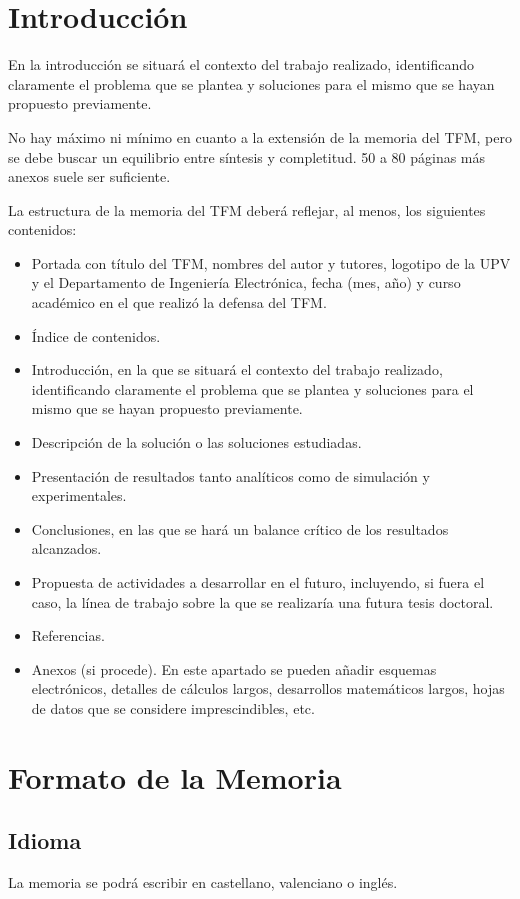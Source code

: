 \chapter{Introducción}
\noindent En la introducción se situará el contexto del trabajo realizado, identificando claramente el problema que se plantea y soluciones para el mismo que se hayan propuesto previamente. 

No hay máximo ni mínimo en cuanto a la extensión de la memoria del TFM, pero se debe buscar un equilibrio entre síntesis y completitud. 50 a 80 páginas más anexos suele ser suficiente.

\noindent La estructura de la memoria del TFM deberá reflejar, al menos, los siguientes contenidos:
\begin{itemize}
	\item Portada con título del TFM, nombres del autor y tutores, logotipo de la UPV y el Departamento de Ingeniería Electrónica, fecha (mes, año) y curso académico en el que realizó la defensa del TFM.
	\item  Índice de contenidos.
	\item  Introducción, en la que se situará el contexto del trabajo realizado, identificando claramente el problema que se plantea y soluciones para el mismo que se hayan propuesto previamente.
	\item  Descripción de la solución o las soluciones estudiadas.
	\item  Presentación de resultados tanto analíticos como de simulación y experimentales.
	\item  Conclusiones, en las que se hará un balance crítico de los resultados alcanzados.
	\item  Propuesta de actividades a desarrollar en el futuro, incluyendo, si fuera el caso, la línea de trabajo sobre la que se realizaría una futura tesis doctoral.
	\item  Referencias.
	\item  Anexos (si procede). En este apartado se pueden añadir esquemas electrónicos, detalles de cálculos largos, desarrollos matemáticos largos, hojas de datos que se considere imprescindibles, etc.
\end{itemize}


\chapter{Formato de la Memoria}
\section{Idioma}
\noindent La memoria se podrá escribir en castellano, valenciano o inglés.
